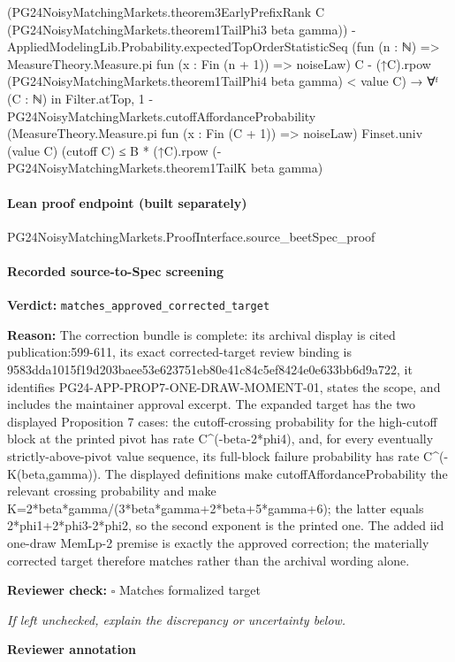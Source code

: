 \documentclass[10pt]{article}
\newcommand{\reviewerbox}{%
  \par\noindent\fbox{\parbox{0.96\linewidth}{\rule{0pt}{0.38in}}}\par
}
\newcommand{\reviewmatch}[1]{%
  \par\noindent\textbf{Reviewer check:} $\square$\; #1\par
  \noindent\emph{If left unchecked, explain the discrepancy or uncertainty below.}\par
}
\begin{document}
\begin{ReviewVerbatim}
                    (PG24NoisyMatchingMarkets.theorem3EarlyPrefixRank C
                      (PG24NoisyMatchingMarkets.theorem1TailPhi3 beta gamma)) -
                  AppliedModelingLib.Probability.expectedTopOrderStatisticSeq
                    (fun (n : ℕ) => MeasureTheory.Measure.pi fun (x : Fin (n + 1)) => noiseLaw) C -
                (↑C).rpow (PG24NoisyMatchingMarkets.theorem1TailPhi4 beta gamma) <
              value C) →
          ∀ᶠ (C : ℕ) in Filter.atTop,
            1 -
                PG24NoisyMatchingMarkets.cutoffAffordanceProbability
                  (MeasureTheory.Measure.pi fun (x : Fin (C + 1)) => noiseLaw) Finset.univ (value C) (cutoff C) ≤
              B * (↑C).rpow (-PG24NoisyMatchingMarkets.theorem1TailK beta gamma)
\end{ReviewVerbatim}

\paragraph{Lean proof endpoint (built separately)}\begin{ReviewVerbatim}
PG24NoisyMatchingMarkets.ProofInterface.source_beetSpec_proof
\end{ReviewVerbatim}

\paragraph{Recorded source-to-Spec screening}
\textbf{Verdict:} \texttt{matches\_approved\_corrected\_target}
\\
{\raggedright
\textbf{Reason:} The correction bundle is complete:\allowbreak{} its archival display is cited publication:\allowbreak{}599-\allowbreak{}611, its exact corrected-\allowbreak{}target review binding is 9583dda1015f19d203baee53e623751eb80e41c84c5ef8424e0e633bb6d9a722, it identifies PG24-\allowbreak{}APP-\allowbreak{}PROP7-\allowbreak{}ONE-\allowbreak{}DRAW-\allowbreak{}MOMENT-\allowbreak{}01, states the scope, and includes the maintainer approval excerpt.\allowbreak{} The expanded target has the two displayed Proposition 7 cases:\allowbreak{} the cutoff-\allowbreak{}crossing probability for the high-\allowbreak{}cutoff block at the printed pivot has rate C\textasciicircum{}(-\allowbreak{}beta-\allowbreak{}2*phi4), and, for every eventually strictly-\allowbreak{}above-\allowbreak{}pivot value sequence, its full-\allowbreak{}block failure probability has rate C\textasciicircum{}(-\allowbreak{}K(beta,gamma)).\allowbreak{} The displayed definitions make cutoffAffordanceProbability the relevant crossing probability and make K=2*beta*gamma/\allowbreak{}(3*beta*gamma+2*beta+5*gamma+6);\allowbreak{} the latter equals 2*phi1+2*phi3-\allowbreak{}2*phi2, so the second exponent is the printed one.\allowbreak{} The added iid one-\allowbreak{}draw MemLp-\allowbreak{}2 premise is exactly the approved correction;\allowbreak{} the materially corrected target therefore matches rather than the archival wording alone.\allowbreak{}
\par}
\reviewmatch{Matches formalized target}
\noindent\textbf{Reviewer annotation}\par
\reviewerbox
\clearpage
\hypertarget{source-claim-96a16163ca076128}{}
\end{document}
